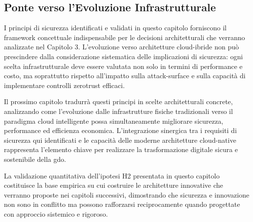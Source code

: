\subsection{\texorpdfstring{Ponte verso l'Evoluzione Infrastrutturale}{2.7.3 - Ponte verso l'Evoluzione Infrastrutturale}}

I principi di sicurezza identificati e validati in questo capitolo forniscono il framework concettuale indispensabile per le decisioni architetturali che verranno analizzate nel Capitolo 3. L'evoluzione verso architetture cloud-ibride non può prescindere dalla considerazione sistematica delle implicazioni di sicurezza: ogni scelta infrastrutturale deve essere valutata non solo in termini di performance e costo, ma soprattutto rispetto all'impatto sulla \gls{attack-surface} e sulla capacità di implementare controlli \gls{zerotrust} efficaci.

Il prossimo capitolo tradurrà questi principi in scelte architetturali concrete, analizzando come l'evoluzione dalle infrastrutture fisiche tradizionali verso il paradigma cloud intelligente possa simultaneamente migliorare sicurezza, performance ed efficienza economica. L'integrazione sinergica tra i requisiti di sicurezza qui identificati e le capacità delle moderne architetture \gls{cloud-native} rappresenta l'elemento chiave per realizzare la trasformazione digitale sicura e sostenibile della \gls{gdo}.

La validazione quantitativa dell'ipotesi H2 presentata in questo capitolo costituisce la base empirica su cui costruire le architetture innovative che verranno proposte nei capitoli successivi, dimostrando che sicurezza e innovazione non sono in conflitto ma possono rafforzarsi reciprocamente quando progettate con approccio sistemico e rigoroso.

